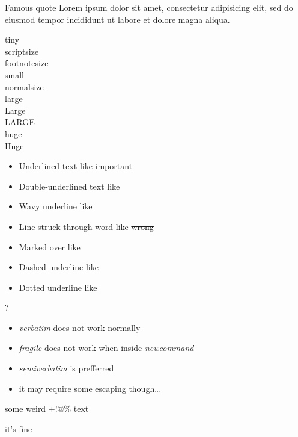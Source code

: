 {
\begin{block}{Famous quote}
Lorem ipsum dolor sit amet, consectetur adipisicing elit, sed do eiusmod tempor incididunt ut labore et dolore magna aliqua.
\end{block}
}


{
\tiny{tiny} \\
\scriptsize{scriptsize} \\
\footnotesize{footnotesize} \\
\small{small} \\
\normalsize{normalsize} \\
\large{large} \\
\Large{Large} \\
\LARGE{LARGE} \\
\huge{huge} \\
\Huge{Huge}
}


{
\begin{itemize}
\item Underlined text like \uline{important}
\item Double-underlined text like 
\item Wavy underline like 
\item Line struck through word like \sout{wrong}
\item Marked over like 
\item Dashed underline like 
\item Dotted underline like 
\end{itemize}
}


{
\begin{center}
\vspace{-8em}
\fontsize{160}{200}\selectfont ?
\end{center}
}


{
\begin{itemize}
\item \emph{verbatim} does not work normally
\item \emph{fragile} does not work when inside \emph{newcommand}
\item \emph{semiverbatim} is prefferred
\item it may require some escaping though\ldots
\end{itemize}
\begin{semiverbatim}
some weird +!@\% text

it's fine \
\end{semiverbatim}
}


